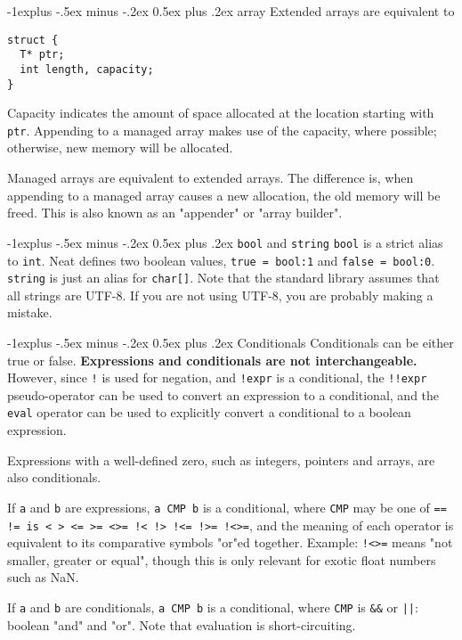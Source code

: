 \documentclass[a4paper,10pt,landscape]{article}
\makeatletter
\newenvironment{segment}[1]
{\begin{mdframed}[roundcorner=5pt]\subsection{#1}}
{\end{mdframed}\vspace{2pt plus 5pt}}
\newcommand{\important}[1]{\textbf{#1}}
\renewcommand{\subsection}{\@startsection{subsection}{2}{0mm}%
			      {-1explus -.5ex minus -.2ex}%
			      {0.5ex plus .2ex}%
			      {\normalfont\normalsize\bfseries}}
\makeatother
\begin{document}
\begin{multicols}{3}
\begin{segment}{array}
Extended arrays are equivalent to
\begin{lstlisting}
struct {
  T* ptr;
  int length, capacity;
}
\end{lstlisting}

Capacity indicates the amount of space allocated at the location starting with \texttt{ptr}.
Appending to a managed array makes use of the capacity, where possible; otherwise, new memory
will be allocated.

Managed arrays are equivalent to extended arrays. The difference is, when appending to a managed
array causes a new allocation, the old memory will be freed. This is also known as an "appender"
or "array builder".

\end{segment}

\begin{segment}{\texttt{bool} and \texttt{string}}
\texttt{bool} is a strict alias to \texttt{int}. Neat defines two boolean values,
\texttt{true = bool:1} and \texttt{false = bool:0}.\\
\texttt{string} is just an alias for \texttt{char[]}. Note that the standard library assumes
that all strings are UTF-8. If you are not using UTF-8, you are probably making a mistake.
\end{segment}

\begin{segment}{Conditionals}
Conditionals can be either true or false. \important{Expressions and conditionals are not interchangeable.}
However, since \texttt{!} is used for negation, and \texttt{!expr} is a conditional, the \texttt{!!expr}
pseudo-operator can be used to convert an expression to a conditional, and the \texttt{eval} operator
can be used to explicitly convert a conditional to a boolean expression.

Expressions with a well-defined zero, such as integers, pointers and arrays, are also conditionals.

If \texttt{a} and \texttt{b} are expressions, \texttt{a CMP b} is a conditional, where
\texttt{CMP} may be one of \texttt{== != is < > <= >= <>= !< !> !<= !>= !<>=}, and the meaning of each
operator is equivalent to its comparative symbols "or"ed together. Example: \texttt{!<>=} means "not
smaller, greater or equal", though this is only relevant for exotic float numbers such as NaN.

If \texttt{a} and \texttt{b} are conditionals, \texttt{a CMP b} is a conditional, where \texttt{CMP}
is \texttt{\&\&} or \texttt{||}: boolean "and" and "or". Note that evaluation is short-circuiting.


\end{segment}
\end{multicols}
\end{document}
